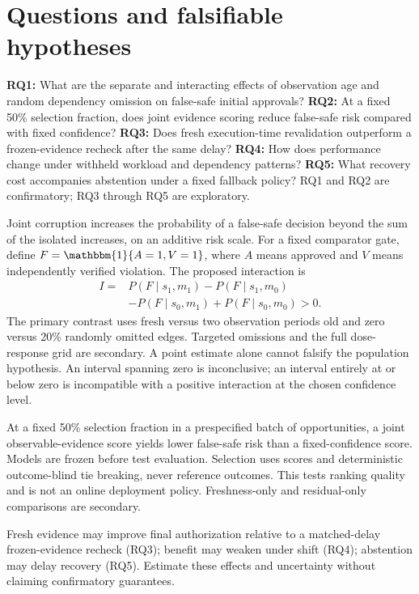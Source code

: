 ﻿\documentclass[sigconf,nonacm]{acmart}
\begin{document}
\section{Questions and falsifiable hypotheses}
\textbf{RQ1:} What are the separate and interacting effects of observation age and random dependency omission on false-safe initial approvals? \textbf{RQ2:} At a fixed 50\% selection fraction, does joint evidence scoring reduce false-safe risk compared with fixed confidence? \textbf{RQ3:} Does fresh execution-time revalidation outperform a frozen-evidence recheck after the same delay? \textbf{RQ4:} How does performance change under withheld workload and dependency patterns? \textbf{RQ5:} What recovery cost accompanies abstention under a fixed fallback policy? RQ1 and RQ2 are confirmatory; RQ3 through RQ5 are exploratory.

\begin{description}[style=nextline]
\item[H1, primary mechanism hypothesis.] Joint corruption increases the probability of a false-safe decision beyond the sum of the isolated increases, on an additive risk scale. For a fixed comparator gate, define $F=\mathbbm{1}\{A=1,V=1\}$, where $A$ means approved and $V$ means independently verified violation. The proposed interaction is
\[
\begin{aligned}I={}&P(F\mid s_1,m_1)-P(F\mid s_1,m_0)\\&-P(F\mid s_0,m_1)+P(F\mid s_0,m_0)>0.\end{aligned}
\]
The primary contrast uses fresh versus two observation periods old and zero versus 20\% randomly omitted edges. Targeted omissions and the full dose-response grid are secondary. A point estimate alone cannot falsify the population hypothesis. An interval spanning zero is inconclusive; an interval entirely at or below zero is incompatible with a positive interaction at the chosen confidence level.
\item[H2, primary selection hypothesis.] At a fixed 50\% selection fraction in a prespecified batch of opportunities, a joint observable-evidence score yields lower false-safe risk than a fixed-confidence score. Models are frozen before test evaluation. Selection uses scores and deterministic outcome-blind tie breaking, never reference outcomes. This tests ranking quality and is not an online deployment policy. Freshness-only and residual-only comparisons are secondary.
\item[Exploratory expectations.] Fresh evidence may improve final authorization relative to a matched-delay frozen-evidence recheck (RQ3); benefit may weaken under shift (RQ4); abstention may delay recovery (RQ5). Estimate these effects and uncertainty without claiming confirmatory guarantees.
\end{description}
\end{document}
